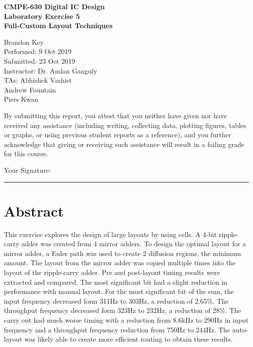 \documentclass[11pt]{article}
\begin{document}
%
%

\vspace*{2 cm}

\begin{center}
\bf{CMPE-630 Digital IC Design\\
    Laboratory Exercise 5\\
\vspace{0.25 cm}
Full-Custom Layout Techniques
}
\end{center}

\vspace{6 cm}

\begin{flushright}
Brandon Key\\
Performed: 9 Oct 2019\\
Submitted: 23 Oct 2019\\
\vspace{0.5 cm}
Instructor: Dr. Amlan Ganguly\\
TAs: Abhishek Vashist\\
Andrew Fountain\\
Piers Kwan\\
\vspace{0.5 cm}
\end{flushright}

\vspace{3 cm}
\indent By submitting this report, you attest that you neither have given nor have received any assistance (including writing, collecting data, plotting figures, tables or graphs, or using previous student reports as a reference), and you further acknowledge that giving or receiving such assistance will result in a failing grade for this course.

\vspace{1 cm}
Your Signature:   \rule{13cm}{.1pt}


\newpage

\section{Abstract}
	This exercise explores the design of large layouts by using cells. A 4-bit ripple-carry adder was created from 4 mirror adders. To design the optimal layout for a mirror adder, a Euler path was used to create 2 diffusion regions, the minimum amount. The layout from the mirror adder was copied multiple times into the layout of the ripple-carry adder. Pre and post-layout timing results were extracted and compared. The most significant bit had a slight reduction in performance with manual layout. For the most significant bit of the sum, the input frequency decreased form 311Hz to 303Hz, a reduction of 2.65\%. The throughput frequency decreased form 323Hz to 232Hz, a reduction of 28\%. The carry out had much worse timing with a reduction from 8.6kHz to 290Hz in input frequency and a throughput frequency reduction from 750Hz to 244Hz. The auto-layout was likely able to create more efficient routing to obtain these results.
\end{document}
